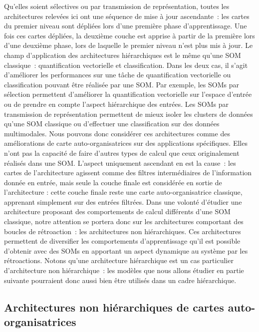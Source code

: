 \documentclass[../main]{subfiles}
\begin{document}
Qu'elles soient sélectives ou par transmission de représentation, toutes les architectures relevées ici ont une séquence de mise à jour ascendante~: les cartes du premier niveau sont dépliées lors d'une première phase d'apprentissage. Une fois ces cartes dépliées, la deuxième couche est apprise à partir de la première lors d'une deuxième phase, lors de laquelle le premier niveau n'est plus mis à jour.
Le champ d'application des architectures hiérarchiques est le même qu'une SOM classique~: quantification vectorielle et classification.
Dans les deux cas, il s'agit d'améliorer les performances sur une tâche de quantification vectorielle ou classification pouvant être réalisée par une SOM. 
Par exemple, les SOMs par sélection permettent d'améliorer la quantification vectorielle sur l'espace d'entrée ou de prendre en compte l'aspect hiérarchique des entrées. Les SOMs par transmission de représentation permettent de mieux isoler les clusters de données qu'une SOM classique ou d'effectuer une classification sur des données multimodales.
Nous pouvons donc considérer ces architectures comme des améliorations de carte auto-organisatrices sur des applications spécifiques.
Elles n'ont pas la capacité de faire d'autres types de calcul que ceux originalement réalisés dans une SOM.
L'aspect uniquement ascendant en est la cause~: les cartes de l'architecture agissent comme des filtres intermédiaires de l'information donnée en entrée, mais seule la couche finale est considérée en sortie de l'architecture : cette couche finale reste une carte auto-organisatrice classique, apprenant simplement sur des entrées filtrées.
Dans une volonté d'étudier une architecture proposant des comportements de calcul différents d'une SOM classique, notre attention se portera donc sur les architectures comportant des boucles de rétroaction~: les architectures non hiérarchiques.
Ces architectures permettent de diversifier les comportements d'apprentissage qu'il est possible d'obtenir avec des SOMs en apportant un aspect dynamique au système par les rétroactions. 
Notons qu'une architecture hiérarchique est un cas particulier d'architecture non hiérarchique~: les modèles que nous allons étudier en partie suivante pourraient donc aussi bien être utilisés dans un cadre hiérarchique.


\subsection{Architectures non hiérarchiques de cartes auto-organisatrices}
\end{document}
